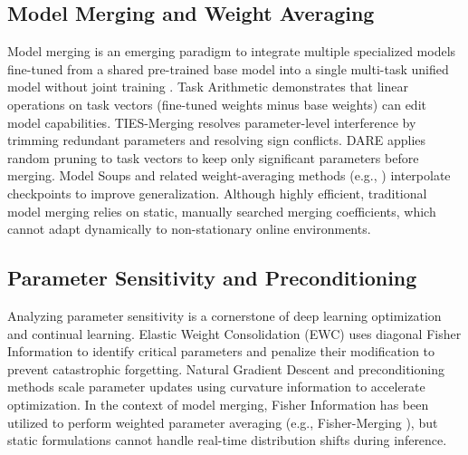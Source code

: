 \documentclass{article}
\theoremstyle{plain}
\theoremstyle{definition}
\theoremstyle{remark}
\begin{document}
\subsection{Model Merging and Weight Averaging}
Model merging is an emerging paradigm to integrate multiple specialized models fine-tuned from a shared pre-trained base model into a single multi-task unified model without joint training \cite{yadav2023ties, ilharco2022editing, choi2024revisiting, bhardwaj2024language, tang2025merging, li2025model}. Task Arithmetic \cite{ilharco2022editing} demonstrates that linear operations on task vectors (fine-tuned weights minus base weights) can edit model capabilities. TIES-Merging \cite{yadav2023ties} resolves parameter-level interference by trimming redundant parameters and resolving sign conflicts. DARE \cite{choi2024revisiting} applies random pruning to task vectors to keep only significant parameters before merging. Model Soups \cite{gu2023hierarchical, jia2023revisiting, guo2022stochastic} and related weight-averaging methods (e.g., \cite{sanyal2023early, kaddour2022stop, eeckt2022weight, lu2022improving, athiwaratkun2018improving, cha2021domain, nikishin2018improving, wan2021analysis, kleiman2025soup, xie2025bone, fassold2023frankenstein}) interpolate checkpoints to improve generalization. Although highly efficient, traditional model merging relies on static, manually searched merging coefficients, which cannot adapt dynamically to non-stationary online environments.

\subsection{Parameter Sensitivity and Preconditioning}
Analyzing parameter sensitivity is a cornerstone of deep learning optimization and continual learning. Elastic Weight Consolidation (EWC) \cite{ates2017survival, ates2016modeling} uses diagonal Fisher Information to identify critical parameters and penalize their modification to prevent catastrophic forgetting. Natural Gradient Descent and preconditioning methods scale parameter updates using curvature information to accelerate optimization. In the context of model merging, Fisher Information has been utilized to perform weighted parameter averaging (e.g., Fisher-Merging \cite{anonymous2026lfwa}), but static formulations cannot handle real-time distribution shifts during inference.
\end{document}
